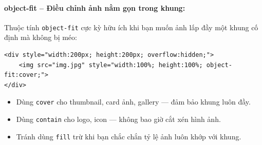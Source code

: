 \documentclass[11pt,oneside]{book}
\newcommand{\thd}[1]{\textcolor{white}{\textbf{\strut #1}}}
\newcommand{\codeinline}[1]{\textcolor{accentOrange}{\texttt{#1}}}
\begin{document}
\paragraph{object-fit – Điều chỉnh ảnh nằm gọn trong khung:}

Thuộc tính \codeinline{object-fit} cực kỳ hữu ích khi bạn muốn ảnh lấp đầy một khung cố định mà không bị méo:

\begin{codeWindow}
\begin{lstlisting}[language=HTML5]
<div style="width:200px; height:200px; overflow:hidden;">
    <img src="img.jpg" style="width:100%; height:100%; object-fit:cover;">
</div>
\end{lstlisting}
\end{codeWindow}

\begin{tipBox}
\begin{itemize}[leftmargin=1.5em, itemsep=2pt, parsep=0pt]
    \item Dùng \codeinline{cover} cho thumbnail, card ảnh, gallery — đảm bảo khung luôn đầy.
    \item Dùng \codeinline{contain} cho logo, icon — không bao giờ cắt xén hình ảnh.
    \item Tránh dùng \codeinline{fill} trừ khi bạn chắc chắn tỷ lệ ảnh luôn khớp với khung.
\end{itemize}
\end{tipBox}

\begin{prettyTableBox}
\end{prettyTableBox}
\end{document}
